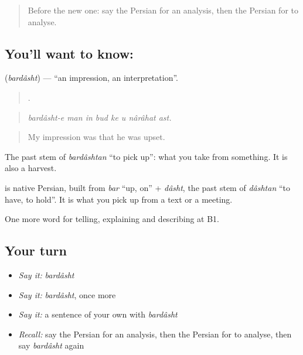 \label{lesson:FA-C368-bardasht}



\begin{quote}
Before the new one: say the Persian for an analysis, then the Persian for to analyse.
\end{quote}

\subsection*{You'll want to know: }
\textbf{} (\emph{bardâsht}) — \textquotedblleft{}an impression, an interpretation\textquotedblright{}.

\begin{quote}
       .
\end{quote}

\begin{quote}
\emph{bardâsht-e man in bud ke u nârâhat ast.}
\end{quote}

\begin{quote}
My impression was that he was upset.
\end{quote}

The past stem of \emph{bardâshtan} \textquotedblleft{}to pick up\textquotedblright{}: what you take from something. It is also a harvest.

\begin{cousinweb}
\textbf{} is native Persian, built from \emph{bar} \textquotedblleft{}up, on\textquotedblright{} + \emph{dâsht}, the past stem of \emph{dâshtan} \textquotedblleft{}to have, to hold\textquotedblright{}. It is what you pick up from a text or a meeting.
\end{cousinweb}

\begin{grammarlens}[title={What you've built}]
One more word for telling, explaining and describing at B1.
\end{grammarlens}

\subsection*{Your turn}
\begin{itemize}
\raggedright
  \item \emph{Say it:} \emph{bardâsht}
  \item \emph{Say it:} \emph{bardâsht}, once more
  \item \emph{Say it:} a sentence of your own with \emph{bardâsht}
  \item \emph{Recall:} say the Persian for an analysis, then the Persian for to analyse, then say \emph{bardâsht} again
\end{itemize}

